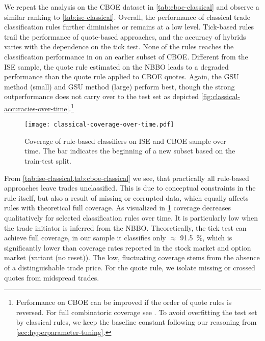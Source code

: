 We repeat the analysis on the \gls{CBOE} dataset in \cref{tab:cboe-classical} and observe a similar ranking to \cref{tab:ise-classical}. Overall, the performance of classical trade classification rules further diminishes or remains at a low level. Tick-based rules trail the performance of quote-based approaches, and the accuracy of hybrids varies with the dependence on the tick test. None of the rules reaches the classification performance in \textcite[][886]{savickasInferringDirectionOption2003} on an earlier subset of \gls{CBOE}. Different from the \gls{ISE} sample, the quote rule estimated on the \gls{NBBO} leads to a degraded performance than the quote rule applied to \gls{CBOE} quotes. Again, the \gls{GSU} method (small) and \gls{GSU} method (large) perform best, though the strong outperformance does not carry over to the test set as depicted \cref{fig:classical-accuracies-over-time}.\footnote{Performance on \gls{CBOE} can be improved if the order of quote rules is reversed. For full combinatoric coverage see \textcite[][44]{grauerOptionTradeClassification2022}. To avoid overfitting the test set by classical rules, we keep the baseline constant following our reasoning from \cref{sec:hyperparameter-tuning}.}

\begin{figure}[!ht]
    \centering
    \texttt{[image: classical-coverage-over-time.pdf]}
    \caption[Coverage of Rule-Based Classifiers Over Time]{Coverage of rule-based classifiers on \gls{ISE} and \gls{CBOE} sample over time. The bar \myline{} indicates the beginning of a new subset based on the train-test split.}
    \label{fig:classical-coverage-over-time}
\end{figure}

From \cref{tab:ise-classical,tab:cboe-classical} we see, that practically all rule-based approaches leave trades unclassified. This is due to conceptual constraints in the rule itself, but also a result of missing or corrupted data, which equally affects rules with theoretical full coverage. As visualized in \cref{fig:classical-coverage-over-time} coverage decreases qualitatively for selected classification rules over time. It is particularly low when the trade initiator is inferred from the \gls{NBBO}. Theoretically, the tick test can achieve full coverage, in our sample it classifies only $\approx$ \SI{91.5}{\percent}, which is significantly lower than coverage rates reported in the stock market \autocite[][535]{ellisAccuracyTradeClassification2000} and option market \autocite[][886]{savickasInferringDirectionOption2003} (variant (no reset)). The low, fluctuating coverage stems from the absence of a distinguishable trade price. For the quote rule, we isolate missing or crossed quotes from midspread trades. 

